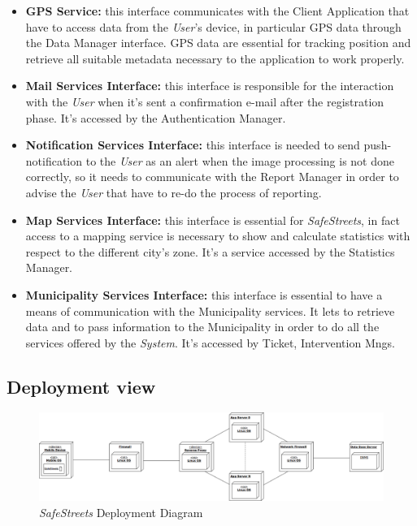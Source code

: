 \documentclass{article}
\begin{document}
		\begin{itemize}
			\item {\bf GPS Service:} this interface communicates with the Client Application that have to access data from the {\it User}'s device, in particular GPS data through the Data Manager interface. GPS data are essential for tracking position and retrieve all suitable metadata necessary to the application to work properly. 
			\item {\bf Mail Services Interface:} this interface is responsible for the interaction with the {\it User} when it's sent a confirmation e-mail after the registration phase. It's accessed by the Authentication Manager.
			\item {\bf Notification Services Interface:} this interface is needed to send push-notification to the {\it User} as an alert when the image processing is not done correctly, so it needs to communicate with the Report Manager in order to advise the {\it User} that have to re-do the process of reporting. 
			\item {\bf Map Services Interface:} this interface is essential for {\it SafeStreets}, in fact access to a mapping service is necessary to show and calculate statistics with respect to the different city's zone. It's a service accessed by the Statistics Manager.
			\item {\bf Municipality Services Interface:} this interface is essential to have a means of communication with the Municipality services. It lets to retrieve data and to pass information to the Municipality in order to do all the services offered by the {\it System}. It's accessed by Ticket, Intervention Mngs. 
		\end{itemize}
		
		\pagebreak
		
	\subsection{Deployment view}
		\begin{figure}[H]
			\centering
			\includegraphics[scale=0.25]{Images/Diagrams/deployment_diagram.png}
			\caption{{\it SafeStreets} Deployment Diagram}
				\end{figure}
		
\end{document}
